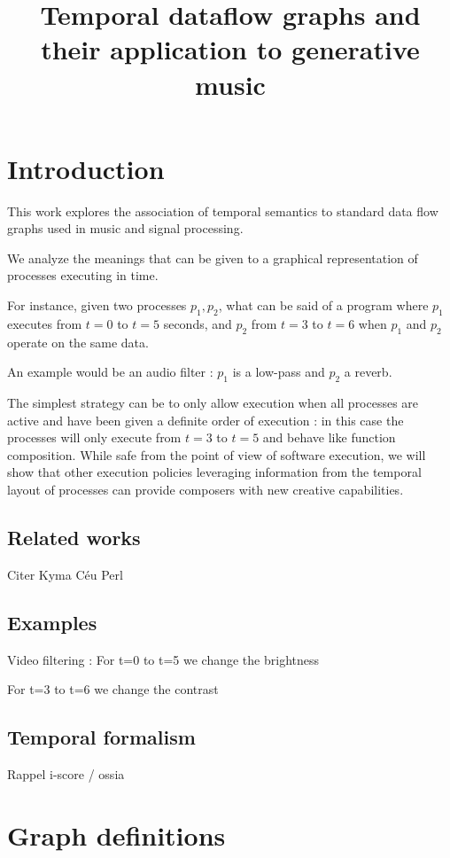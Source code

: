 \documentclass[a4paper,twocolumns]{article}
\title{Temporal dataflow graphs and their application to generative music}
\begin{document}
	\maketitle
	
	\section{Introduction}
    This work explores the association of temporal semantics to standard data flow graphs used in music and signal processing.
    
    We analyze the meanings that can be given to a graphical representation of processes executing in time. 
    
    For instance, given two processes $p_1, p_2$, what can be said of a program where $p_1$ executes from $t=0$ to $t=5$ seconds, and $p_2$ from $t=3$ to $t=6$ when $p_1$ and $p_2$ operate on the same data.
    
    An example would be an audio filter : $p_1$ is a low-pass and $p_2$ a reverb.
    
    The simplest strategy can be to only allow execution when all processes are active and have been given a definite order of execution : in this case the processes will only execute from $t=3$ to $t=5$ and behave like function composition. 
    While safe from the point of view of software execution, we will show that other execution policies leveraging information from the temporal layout of processes can provide composers with new creative capabilities.
    
    
    \subsection{Related works}
    Citer Kyma
    Céu
    Perl
    
    \subsection{Examples}
    Video filtering : 
    For t=0 to t=5 we change the brightness
    
    For t=3 to t=6 we change the contrast
    
    \subsection{Temporal formalism}
    Rappel i-score / ossia
    
    
    
	\section{Graph definitions}
\end{document}
